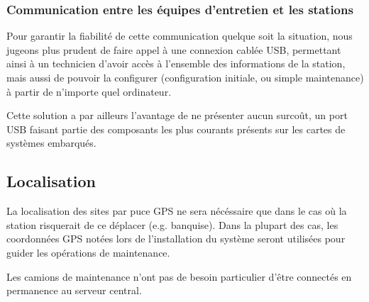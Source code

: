 \subsubsection{Communication entre les équipes d’entretien et les stations}

Pour garantir la fiabilité de cette communication quelque soit la situation, nous jugeons plus prudent de faire appel à une connexion cablée USB, permettant ainsi à un technicien d’avoir accès à l’ensemble des informations de la station, mais aussi de pouvoir la configurer (configuration initiale, ou simple maintenance) à partir de n’importe quel ordinateur.

Cette solution a par ailleurs l’avantage de ne présenter aucun surcoût, un port USB faisant partie des composants les plus courants présents sur les cartes de systèmes embarqués.

\subsection{Localisation}

La localisation des sites par puce GPS ne sera nécéssaire que dans le cas où la station risquerait de ce déplacer (e.g. banquise). Dans la plupart des cas, les coordonnées GPS notées lors de l’installation du système seront utilisées pour guider les opérations de maintenance.

Les camions de maintenance n'ont pas de besoin particulier d'être connectés en permanence au serveur central.


	 	

